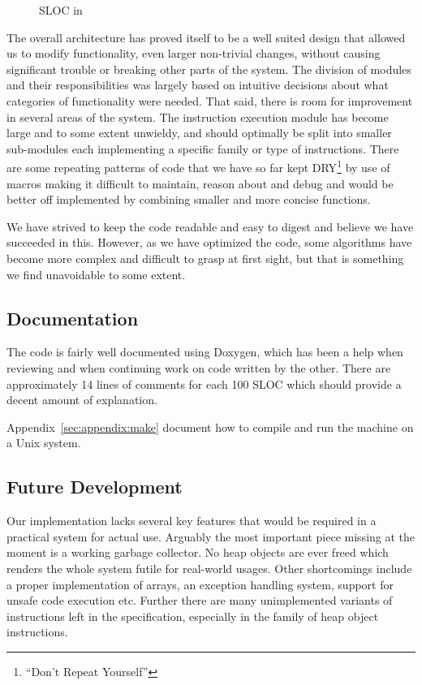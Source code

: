 \begin{figure}
  \centering
  
  \caption{SLOC in \thename{}}
\label{fig:eval:sloc}
\end{figure}

The overall architecture has proved itself to be a well suited design that
allowed us to modify functionality, even larger non-trivial changes, without
causing significant trouble or breaking other parts of the system. The division
of modules and their responsibilities was largely based on intuitive decisions
about what categories of functionality were needed. That said, there is room for
improvement in several areas of the system. The instruction execution module has
become large and to some extent unwieldy, and should optimally be split into
smaller sub-modules each implementing a specific family or type of
instructions. There are some repeating patterns of code that we have so far kept
DRY\footnote{``Don't Repeat Yourself''} by use of macros making it difficult to
maintain, reason about and debug and would be better off implemented by
combining smaller and more concise functions.

We have strived to keep the code readable and easy to digest and believe we have
succeeded in this. However, as we have optimized the code, some algorithms have
become more complex and difficult to grasp at first sight, but that is something
we find unavoidable to some extent.

\subsection{Documentation}

The code is fairly well documented using Doxygen, which has been a help when
reviewing and when continuing work on code written by the other. There are
approximately 14 lines of comments for each 100 SLOC which should provide a
decent amount of explanation.

Appendix~\ref{sec:appendix:make} document how to compile and run the machine on
a Unix system.

\subsection{Future Development}

Our \thename{} implementation lacks several key features that would be required
in a practical system for actual use. Arguably the most important piece missing
at the moment is a working garbage collector. No heap objects are ever freed
which renders the whole system futile for real-world usages. Other shortcomings
include a proper implementation of arrays, an exception handling system, support
for unsafe code execution etc. Further there are many unimplemented variants of
instructions left in the specification, especially in the family of heap object
instructions.

